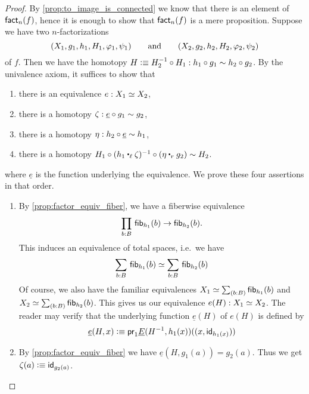 \begin{proof}
By \autoref{prop:to_image_is_connected} we know that there is an element of $\fact_n(f)$, hence it is enough to
show that $\fact_n(f)$ is a mere proposition. Suppose we have two $n$-factorizations
\begin{equation*}
\pairr{X_1,g_1,h_1,H_1,\varphi_1,\psi_1}\qquad\text{and}\qquad\pairr{X_2,g_2,h_2,H_2,\varphi_2,\psi_2}
\end{equation*}
of $f$. Then we have the homotopy $H\defeq H_2^{-1}\circ H_1:h_1\circ g_1\htpy h_2\circ g_2$. By the univalence axiom, it suffices to show that
\begin{enumerate}
\item there is an equivalence $e:X_1\eqvsym X_2$,
\item there is a homotopy $\zeta:\underline{e}\circ g_1\htpy g_2$,
\item there is a homotopy $\eta:h_2\circ\underline{e}\htpy h_1$,
\item there is a homotopy $H_1 \circ(h_1\leftwhisker\zeta)^{-1}\circ(\eta\rightwhisker g_2)\htpy H_2$.
\end{enumerate}
where $\underline{e}$ is the function underlying the equivalence. We prove these four assertions in that order.
\begin{enumerate}
\item By \autoref{prop:factor_equiv_fiber}, we have a fiberwise equivalence
\begin{equation*}
\prd{b:B} \hfib{h_1}b\to\hfib{h_2}b.
\end{equation*}
This induces an equivalence of total spaces, i.e.\ we have
\begin{equation*}
\sm{b:B} \hfib{h_1}b\eqvsym\sm{b:B}\hfib{h_2}b
\end{equation*}
Of course, we also have the familiar equivalences $X_1\eqvsym\sm{b:B}\hfib{h_1}b$ and $X_2\eqvsym\sm{b:B}
\hfib{h_2}b$. This gives us our equivalence $e(H):X_1\eqvsym X_2$. The reader may verify that the underlying function
$\underline{e}(H)$ of $e(H)$ is defined by
\begin{equation*}
\underline{e}(H,x)\defeq \proj1\underline{E}(H^{-1},h_1(x))(\pairr{x,\idfunc[h_1(x)]})
\end{equation*}
\item By \autoref{prop:factor_equiv_fiber} we have $\underline{e}(H,g_1(a))=g_2(a)$. Thus we get $\zeta(a)\defeq \idfunc[g_2(a)]$. \label{item:orth-fact-2}

\end{enumerate}
\end{proof}

